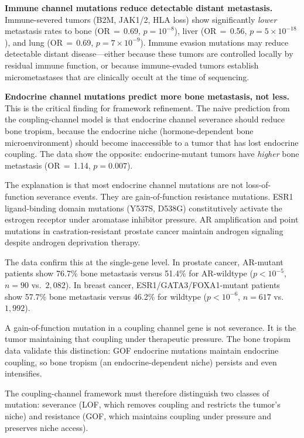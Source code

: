 \documentclass[11pt]{article}
\begin{document}
\textbf{Immune channel mutations reduce detectable distant metastasis.}
Immune-severed tumors (B2M, JAK1/2, HLA loss) show significantly
\emph{lower} metastasis rates to bone (OR\,$=$\,0.69,
$p = 10^{-8}$), liver (OR\,$=$\,0.56, $p = 5 \times 10^{-18}$),
and lung (OR\,$=$\,0.69, $p = 7 \times 10^{-9}$). Immune evasion
mutations may reduce detectable distant disease---either because these
tumors are controlled locally by residual immune function, or because
immune-evaded tumors establish micrometastases that are clinically
occult at the time of sequencing.

\textbf{Endocrine channel mutations predict more bone metastasis,
not less.}
This is the critical finding for framework refinement. The naive
prediction from the coupling-channel model is that endocrine channel
severance should reduce bone tropism, because the endocrine niche
(hormone-dependent bone microenvironment) should become inaccessible
to a tumor that has lost endocrine coupling. The data show the
opposite: endocrine-mutant tumors have \emph{higher} bone metastasis
(OR\,$=$\,1.14, $p = 0.007$).

The explanation is that most endocrine channel mutations are not
loss-of-function severance events. They are gain-of-function
resistance mutations. ESR1 ligand-binding domain mutations (Y537S,
D538G) constitutively activate the estrogen receptor under aromatase
inhibitor pressure. AR amplification and point mutations in
castration-resistant prostate cancer maintain androgen signaling
despite androgen deprivation therapy.

The data confirm this at the single-gene level. In prostate cancer,
AR-mutant patients show 76.7\% bone metastasis versus 51.4\% for
AR-wildtype ($p < 10^{-5}$, $n = 90$ vs.\ $2{,}082$). In breast
cancer, ESR1/GATA3/FOXA1-mutant patients show 57.7\% bone metastasis
versus 46.2\% for wildtype ($p < 10^{-6}$, $n = 617$ vs.\
$1{,}992$).

A gain-of-function mutation in a coupling channel gene is not
severance. It is the tumor maintaining that coupling under
therapeutic pressure. The bone tropism data validate this
distinction: GOF endocrine mutations maintain endocrine coupling,
so bone tropism (an endocrine-dependent niche) persists and even
intensifies.

The coupling-channel framework must therefore distinguish two
classes of mutation: severance (LOF, which removes coupling and
restricts the tumor's niche) and resistance (GOF, which maintains
coupling under pressure and preserves niche access).
\end{document}
